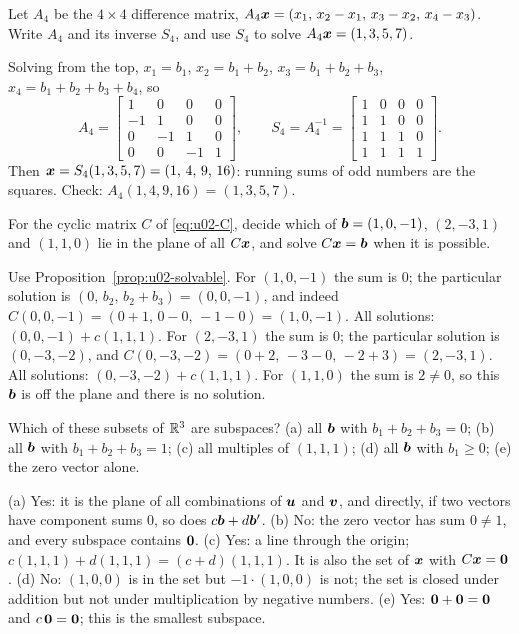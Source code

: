 \begin{exercise}\label{ex:u02-four}
Let $A_4$ be the $4\times4$ difference matrix, $A_4\boldsymbol{x}=(x_1,\,x_2-x_1,\,x_3-x_2,\,x_4-x_3)$.
Write $A_4$ and its inverse $S_4$, and use $S_4$ to solve $A_4\boldsymbol{x}=(1,3,5,7)$.
\end{exercise}
\begin{solution}
Solving from the top, $x_1=b_1$, $x_2=b_1+b_2$, $x_3=b_1+b_2+b_3$,
$x_4=b_1+b_2+b_3+b_4$, so
\[
  A_4=\begin{bmatrix} 1&0&0&0\\ -1&1&0&0\\ 0&-1&1&0\\ 0&0&-1&1\end{bmatrix},\qquad
  S_4=A_4^{-1}=\begin{bmatrix} 1&0&0&0\\ 1&1&0&0\\ 1&1&1&0\\ 1&1&1&1\end{bmatrix}.
\]
Then $\boldsymbol{x}=S_4(1,3,5,7)=(1,\,4,\,9,\,16)$: running sums of odd numbers are the squares.
Check: $A_4(1,4,9,16)=(1,3,5,7)$.
\end{solution}

\begin{exercise}\label{ex:u02-cyclic}
For the cyclic matrix $C$ of \eqref{eq:u02-C}, decide which of $\boldsymbol{b}=(1,0,-1)$,
$(2,-3,1)$ and $(1,1,0)$ lie in the plane of all $C\boldsymbol{x}$, and solve $C\boldsymbol{x}=\boldsymbol{b}$ when it
is possible.
\end{exercise}
\begin{solution}
Use Proposition~\ref{prop:u02-solvable}. For $(1,0,-1)$ the sum is $0$; the particular
solution is $(0,\,b_2,\,b_2+b_3)=(0,0,-1)$, and indeed $C(0,0,-1)=(0+1,\,0-0,\,-1-0)=(1,0,-1)$.
All solutions: $(0,0,-1)+c(1,1,1)$. For $(2,-3,1)$ the sum is $0$; the particular solution
is $(0,-3,-2)$, and $C(0,-3,-2)=(0+2,\,-3-0,\,-2+3)=(2,-3,1)$. All solutions:
$(0,-3,-2)+c(1,1,1)$. For $(1,1,0)$ the sum is $2\neq0$, so this $\boldsymbol{b}$ is off the plane
and there is no solution.
\end{solution}

\begin{exercise}\label{ex:u02-which}
Which of these subsets of $\mathbb{R}^3$ are subspaces? (a) all $\boldsymbol{b}$ with $b_1+b_2+b_3=0$;
(b) all $\boldsymbol{b}$ with $b_1+b_2+b_3=1$; (c) all multiples of $(1,1,1)$; (d) all $\boldsymbol{b}$
with $b_1\ge0$; (e) the zero vector alone.
\end{exercise}
\begin{solution}
(a) Yes: it is the plane of all combinations of $\boldsymbol{u}$ and $\boldsymbol{v}$, and directly, if two
vectors have component sums $0$, so does $c\boldsymbol{b}+d\boldsymbol{b}'$. (b) No: the zero vector has sum
$0\neq1$, and every subspace contains $\boldsymbol{0}$. (c) Yes: a line through the origin;
$c(1,1,1)+d(1,1,1)=(c+d)(1,1,1)$. It is also the set of $\boldsymbol{x}$ with $C\boldsymbol{x}=\boldsymbol{0}$.
(d) No: $(1,0,0)$ is in the set but $-1\cdot(1,0,0)$ is not; the set is closed under
addition but not under multiplication by negative numbers. (e) Yes: $\boldsymbol{0}+\boldsymbol{0}=\boldsymbol{0}$
and $c\,\boldsymbol{0}=\boldsymbol{0}$; this is the smallest subspace.
\end{solution}

